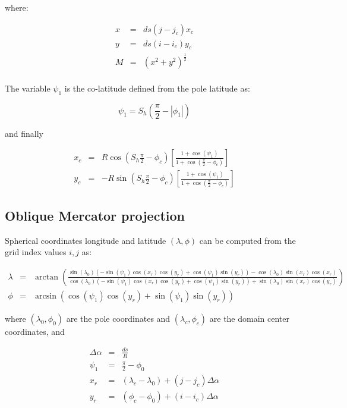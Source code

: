where:

\begin{eqnarray}
  x &=& ds \left(j-j_c\right) x_c \\
  y &=& ds \left(i-i_c\right) y_c \\
  M &=& \left(x^2+y^2\right)^{\frac{1}{2}} \\
\end{eqnarray}

The variable $\psi_1$ is the co-latitude defined from the pole latitude as:

\begin{equation}
  \psi_1 = S_h \left(\frac{\pi}{2} - |\phi_1| \right)
\end{equation}

and finally

\begin{eqnarray}
  x_c &=& R \cos \left(S_h \frac{\pi}{2} - \phi_c\right)
        \left[\frac{1+\cos(\psi_1)}{1+\cos\left(\frac{\pi}{2}-\phi_c\right)}
        \right] \\
  y_c &=& -R \sin \left(S_h \frac{\pi}{2} - \phi_c\right)
        \left[\frac{1+\cos(\psi_1)}{1+\cos\left(\frac{\pi}{2}-\phi_c\right)}
        \right]
\end{eqnarray}

\subsection{Oblique Mercator projection}

Spherical coordinates longitude and latitude $(\lambda, \phi)$ can be computed
from the grid index values $i,j$ as:

\begin{eqnarray}
  \lambda &=& \arctan\left(\frac{\sin(\lambda_0)\left(-\sin(\psi_1)
              \cos(x_r)\cos(y_r)+\cos(\psi_1)\sin(y_r)\right)
              -\cos(\lambda_0)\sin(x_r)\cos(x_r)}
              {\cos(\lambda_0)\left(-\sin(\psi_1)\cos(x_r)\cos(y_r)+
               \cos(\psi_1)\sin(y_r)\right)+\sin(\lambda_0)\sin(x_r)
               \cos(y_r)}\right) \\
  \phi &=& \arcsin\left( \cos(\psi_1)\cos(y_r)+\sin(\psi_1)\sin(y_r) \right)
\end{eqnarray}

where $(\lambda_0,\phi_0)$ are the pole coordinates and $(\lambda_c,\phi_c)$
are the domain center coordinates, and

\begin{eqnarray}
  \Delta\alpha &=& \frac{ds}{R} \\
  \psi_1 &=& \frac{\pi}{2} - \phi_0 \\
  x_r &=& (\lambda_c - \lambda_0) + (j-j_c) \Delta\alpha \\
  y_r &=& (\phi_c - \phi_0) + (i-i_c) \Delta\alpha
\end{eqnarray}

